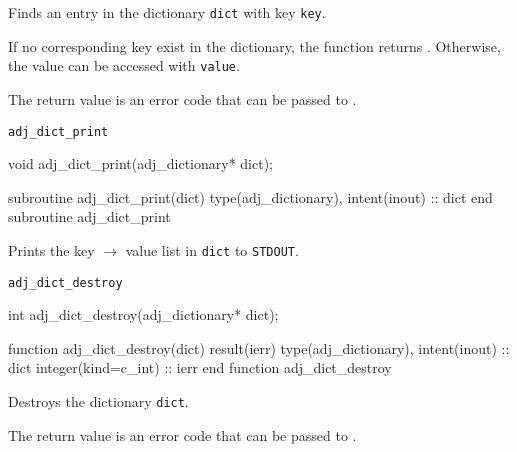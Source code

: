 Finds an entry in the dictionary \texttt{dict} with key \texttt{key}.

If no corresponding key exist in the dictionary, the function returns .
Otherwise, the value can be accessed with \texttt{value}.

The return value is an error code that can be passed to .


\begin{boxwithtitle}{\texttt{adj_dict_print}}
\begin{minipage}{\columnwidth}
\begin{ccode}
  void adj_dict_print(adj_dictionary* dict);
\end{ccode}
\begin{fortrancode}
  subroutine adj_dict_print(dict)
    type(adj_dictionary), intent(inout) :: dict
  end subroutine adj_dict_print
\end{fortrancode}
\end{minipage}
\end{boxwithtitle}

Prints the key $\to$ value list in \texttt{dict} to \texttt{STDOUT}. 

\begin{boxwithtitle}{\texttt{adj_dict_destroy}}
\begin{minipage}{\columnwidth}
\begin{ccode}
  int adj_dict_destroy(adj_dictionary* dict);
\end{ccode}
\begin{fortrancode}
  function adj_dict_destroy(dict) result(ierr)
    type(adj_dictionary), intent(inout) :: dict
    integer(kind=c_int) :: ierr
  end function adj_dict_destroy
\end{fortrancode}
\end{minipage}
\end{boxwithtitle}

Destroys the dictionary \texttt{dict}.

The return value is an error code that can be passed to .

